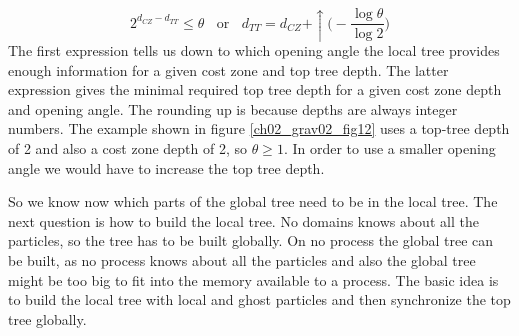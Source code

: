 \begin{equation}
2^{d_{CZ} - d_{TT}} \le \theta ~~~~\text{or}~~~~ d_{TT} = d_{CZ} + \uparrow \Big( - \frac{ \log{\theta} }{\log{2} } \Big)
\end{equation}
The first expression tells us down to which opening angle the local tree provides enough information for a given cost zone and top tree depth. The latter expression gives the minimal required top tree depth for a given cost zone depth and opening angle. The rounding up is because depths are always integer numbers. The example shown in figure \ref{ch02_grav02_fig12} uses a top-tree depth of 2 and also a cost zone depth of 2, so $\theta \ge 1$. In order to use a smaller opening angle we would have to increase the top tree depth.

So we know now which parts of the global tree need to be in the local tree. The next question is how to build the local tree. No domains knows about all the particles, so the tree has to be built globally. On no process the global tree can be built, as no process knows about all the particles and also the global tree might be too big to fit into the memory available to a process. The basic idea is to build the local tree with local and ghost particles and then synchronize the top tree globally.

